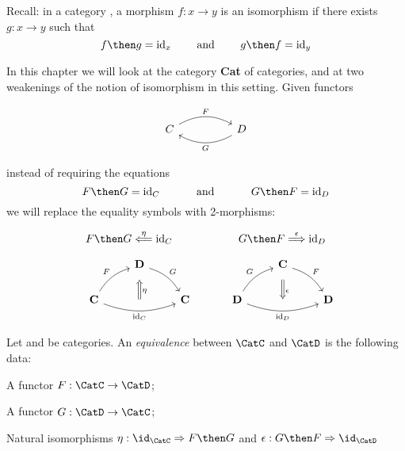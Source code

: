
Recall: in a category \CatC, a morphism $f: x \rightarrow y$ is an isomorphism if there exists $g : x \rightarrow y$ such that
\[
    f \then g = \text{id}_x \quad \quad \text{ and } \quad \quad g \then f = \text{id}_y
\]


In this chapter we will look at the category \textbf{Cat} of categories, and at two weakenings of the notion of isomorphism in this setting.
Given functors

\[\begin{tikzcd}
      C && D
      \arrow["F", bend left=30, from=1-1, to=1-3]
      \arrow["G", bend left=30, from=1-3, to=1-1]
\end{tikzcd}\]

instead of requiring the equations
\[
    F \then G = \text{id}_C  \quad \quad \quad  \text{ and } \quad \quad \quad G \then F = \text{id}_D
\]
we will replace the equality symbols with 2-morphisms:
\

\[
    F \then G \overset{\eta}{\Longleftarrow} \text{id}_C  \quad \quad \quad \quad \quad \quad G \then F \overset{\epsilon}{\Longrightarrow} \text{id}_D
\]


\[
    \quad
    \begin{tikzcd}
        & {\mathbf{D}} \\
        {\mathbf{C}} && {\mathbf{C}}
        \arrow["F", bend left=20, from=2-1, to=1-2]
        \arrow["G", bend left=20, from=1-2, to=2-3]
        \arrow[""{name=0, anchor=center, inner sep=0}, "{\text{id}_C}"', bend right=20, from=2-1, to=2-3]
        \arrow["\eta", shorten <=7pt, shorten >=10pt, Leftarrow, from=1-2, to=0]
    \end{tikzcd}
    \quad \quad \quad
    \begin{tikzcd}
        & {\mathbf{C}} \\
        {\mathbf{D}} && {\mathbf{D}}
        \arrow["G", bend left=20, from=2-1, to=1-2]
        \arrow["F", bend left=20, from=1-2, to=2-3]
        \arrow[""{name=0, anchor=center, inner sep=0}, "{\text{id}_D}"', bend right=20, from=2-1, to=2-3]
        \arrow["\epsilon", shorten <=7pt, shorten >=10pt, Rightarrow, from=1-2, to=0]
    \end{tikzcd}
\]

\begin{ctdefinition}[]
    \label{def:cat-equivalence}
    Let \CatC and \CatD be categories. An \emph{equivalence} between $\CatC$ and $\CatD$ is the following data:
    \begin{compactenum}
        \item A functor $F:  \CatC \rightarrow \CatD$;
        \item A functor $G: \CatD \rightarrow \CatC $;
        \item Natural isomorphisms $\eta : \id_\CatC \Rightarrow F \then G$ and $\epsilon : G \then F \Rightarrow \id_\CatD$
    \end{compactenum}
\end{ctdefinition}


